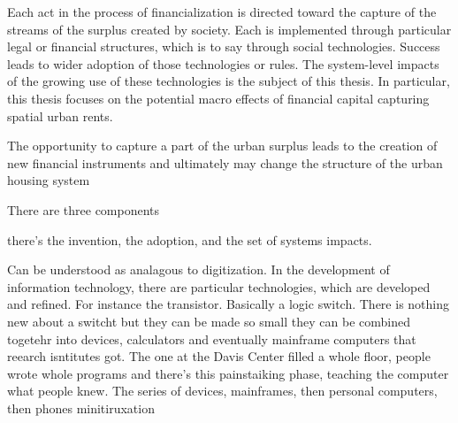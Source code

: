 Each act in the process of financialization is directed toward the capture of the streams of the surplus created by society. Each is implemented  through particular legal or financial structures, which is to say through social technologies. Success leads to wider adoption of those technologies or rules. The system-level impacts of the growing use of these technologies is the  subject of this thesis. In particular, this thesis focuses on the potential macro effects of financial capital capturing spatial urban rents. 

The opportunity to capture a part of the urban surplus leads to the creation of new financial instruments and ultimately may change the structure of the urban housing system 







 
There are three components

there's the invention,
the adoption,
and the set of systems impacts.



Can be understood as analagous to digitization. In the development of information technology, there are particular technologies, which are developed and refined. For instance the transistor. Basically a logic switch. There is nothing new about a switcht but they can be made so small they can be combined togetehr into devices, calculators and eventually mainframe computers that reearch isntitutes got. The one at the Davis Center filled a whole floor, people wrote whole programs
and there's this painstaiking phase, teaching the computer what people knew.
The series of devices, mainframes, then personal computers, then phones minitiruxation

